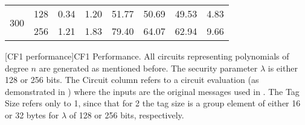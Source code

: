 \begin{table}[htb]
{\begin{tabular}{|r|r|rrrr|r|r|}
\multicolumn{1}{|r|}{\multirow{2}{*}{300}} & 128       & 0.34                       & 1.20                     & 51.77                   & 50.69      & 49.53                     & 4.83     \\
\multicolumn{1}{|r|}{}                     & 256       & 1.21                       & 1.83                     & 79.40                   & 64.07      & 62.94                     & 9.66     \\ \hline
\end{tabular}
}
[CF1 performance]{CF1 Performance. All circuits representing
  polynomials of degree $n$ are generated as mentioned before. The security
  parameter $\lambda$ is either 128 or 256 bits. The Circuit column refers to
  a circuit evaluation (as demonstrated in ) where the
  inputs are the original messages used in \Auth. The Tag Size refers only to
  1, since that for
  2 the tag size is a group element of either
16 or 32 bytes for $\lambda$ of 128 or 256 bits,
respectively.}\label{tab:cf-perf}
\end{table}
